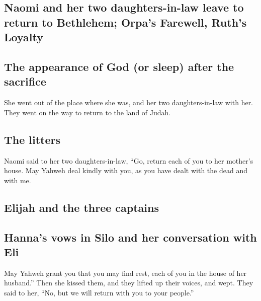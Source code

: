\hypertarget{naomi-and-her-two-daughters-in-law-leave-to-return-to-bethlehem-orpas-farewell-ruths-loyalty}{%
\subsection{Naomi and her two daughters-in-law leave to return to
Bethlehem; Orpa's Farewell, Ruth's
Loyalty}\label{naomi-and-her-two-daughters-in-law-leave-to-return-to-bethlehem-orpas-farewell-ruths-loyalty}}

\hypertarget{the-appearance-of-god-or-sleep-after-the-sacrifice}{%
\subsection{The appearance of God (or sleep) after the
sacrifice}\label{the-appearance-of-god-or-sleep-after-the-sacrifice}}

 She went out of the place where she was, and her two
daughters-in-law with her. They went on the way to return to the land of
Judah.

\hypertarget{the-litters}{%
\subsection{The litters}\label{the-litters}}

 Naomi said to her two daughters-in-law, ``Go, return each
of you to her mother's house. May Yahweh deal kindly with you, as you
have dealt with the dead and with me.

\hypertarget{elijah-and-the-three-captains}{%
\subsection{Elijah and the three
captains}\label{elijah-and-the-three-captains}}

\hypertarget{hannas-vows-in-silo-and-her-conversation-with-eli}{%
\subsection{Hanna's vows in Silo and her conversation with
Eli}\label{hannas-vows-in-silo-and-her-conversation-with-eli}}

 May Yahweh grant you that you may find rest, each of you
in the house of her husband.'' Then she kissed them, and they lifted up
their voices, and wept.  They said to her, ``No, but we
will return with you to your people.''

